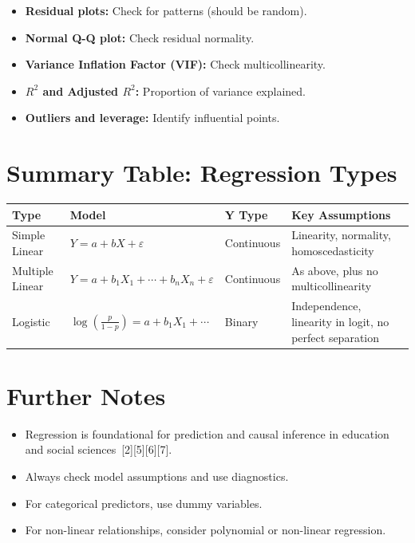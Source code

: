 \documentclass[11pt]{article}
\begin{document}
\begin{itemize}
    \item \textbf{Residual plots:} Check for patterns (should be random).
    \item \textbf{Normal Q-Q plot:} Check residual normality.
    \item \textbf{Variance Inflation Factor (VIF):} Check multicollinearity.
    \item \textbf{$R^2$ and Adjusted $R^2$:} Proportion of variance explained.
    \item \textbf{Outliers and leverage:} Identify influential points.
\end{itemize}

\section{Summary Table: Regression Types}

\begin{tabular}{|l|l|l|l|}
\hline
\textbf{Type} & \textbf{Model} & \textbf{Y Type} & \textbf{Key Assumptions} \\
\hline
Simple Linear & $Y = a + bX + \varepsilon$ & Continuous & Linearity, normality, homoscedasticity \\
Multiple Linear & $Y = a + b_1 X_1 + \cdots + b_n X_n + \varepsilon$ & Continuous & As above, plus no multicollinearity \\
Logistic & $\log(\frac{p}{1-p}) = a + b_1 X_1 + \cdots$ & Binary & Independence, linearity in logit, no perfect separation \\
\hline
\end{tabular}

\section{Further Notes}

\begin{itemize}
    \item Regression is foundational for prediction and causal inference in education and social sciences\ [2][5][6][7].
    \item Always check model assumptions and use diagnostics.
    \item For categorical predictors, use dummy variables.
    \item For non-linear relationships, consider polynomial or non-linear regression.
\end{itemize}
\end{document}
